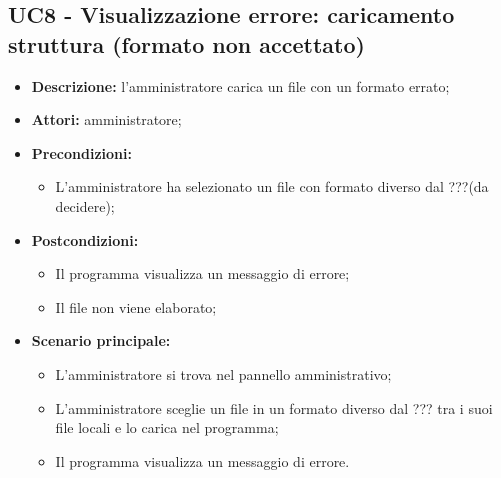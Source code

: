 \documentclass[5pt]{article}
\begin{document}
\subsection{UC8 - Visualizzazione errore: caricamento struttura (formato non accettato)}
\label{sec:UC8}
\begin{itemize}
    \item \textbf{Descrizione:} l’amministratore carica un file con un formato errato;
    \item \textbf{Attori:} amministratore;
    \item \textbf{Precondizioni:} 
    \begin{itemize}
        \item L’amministratore ha selezionato un file con formato diverso dal ???(da decidere);
    \end{itemize}
    \item \textbf{Postcondizioni:} 
    \begin{itemize}
        \item Il programma visualizza un messaggio di errore;
        \item Il file non viene elaborato;
    \end{itemize}
    \item \textbf{Scenario principale:} 
    \begin{itemize}
        \item L’amministratore si trova nel pannello amministrativo;
        \item L’amministratore sceglie un file in un formato diverso dal ??? tra i suoi file locali e lo carica nel programma;
        \item Il programma visualizza un messaggio di errore.
    \end{itemize}
\end{itemize}
\end{document}
